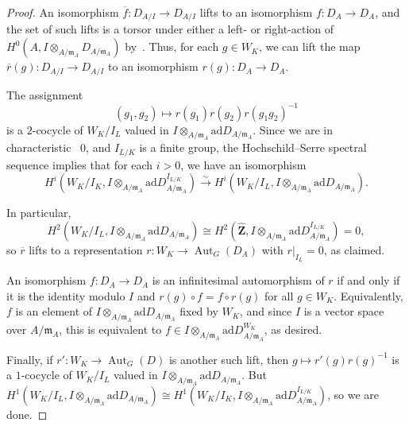\documentclass{amsart}
\renewcommand{\mathbb}{\mathbf}
\def\ad{\mathrm{ad}}
\theoremstyle{definition}
\theoremstyle{remark}
\newcommand{\Z}{\ZZ}
\newcommand{\ZZ}{{\mathbb Z}}
\DeclareMathOperator{\Aut}{Aut}
\begin{document}
\begin{proof}
An isomorphism $\overline{f}:D_{A/I}\rightarrow D_{A/I}$ lifts to an isomorphism $f:D_A\rightarrow D_A$, and the set of such lifts is a torsor under either a left- or right-action of $H^0(A,I\otimes_{A/\mathfrak{m}_A}D_{A/\mathfrak{m}_A})$ by~\cite[Lemma 3.5]{2014arXiv1403.1411B}.  Thus, for each $g\in W_K$, we can lift the map $\overline{r}(g):D_{A/I}\rightarrow D_{A/I}$ to an isomorphism $r(g):D_A\rightarrow D_A$.  

The assignment
\[	(g_1,g_2)\mapsto r(g_1)r(g_2)r(g_1g_2)^{-1}	\]
is a $2$-cocycle of $W_K/I_L$ valued in
$I\otimes_{A/\mathfrak{m}_A}\ad D_{A/\mathfrak{m}_A}$.  Since we are in
characteristic~ $0$, and $I_{L/K}$ is a finite group,  the
Hochschild--Serre spectral sequence implies that for each $i>0$, we
have an isomorphism %
\[ H^i(W_K/I_K,I\otimes_{A/\mathfrak{m}_A}\ad D_{A/\mathfrak{m}_A}^{I_{L/K}})\xrightarrow{\sim} H^i(W_K/I_L,I\otimes_{A/\mathfrak{m}_A}\ad D_{A/\mathfrak{m}_A}).\]%

In particular, 
\[	H^2(W_K/I_L,I\otimes_{A/\mathfrak{m}_A}\ad D_{A/\mathfrak{m}_A})\cong H^2(\widehat{\Z},I\otimes_{A/\mathfrak{m}_A}\ad D_{A/\mathfrak{m}_A}^{I_{L/K}})=0,	\]
so $\overline r$ lifts to a representation $r:W_K\rightarrow
\Aut_G(D_A)$ with $r|_{I_L}=0$, as claimed.

An isomorphism $f:D_A\rightarrow D_A$ is an infinitesimal automorphism of $r$ if and
only if it is the identity modulo $I$ and $r(g)\circ f=f\circ r(g)$ for all $g\in W_K$.  Equivalently, $f$ is an element of $I\otimes_{A/\mathfrak{m}_A}\ad D_{A/\mathfrak{m}_A}$ fixed by $W_K$, and since $I$ is a vector space over $A/\mathfrak{m}_A$, this is equivalent to $f\in I\otimes_{A/\mathfrak{m}_A}\ad D_{A/\mathfrak{m}_A}^{W_K}$, as desired.

Finally, if $r':W_K\rightarrow \Aut_G(D)$ is another such lift, then $g\mapsto r'(g)r(g)^{-1}$ is a $1$-cocycle of $W_K/I_L$ valued in $I\otimes_{A/\mathfrak{m}_A}\ad D_{A/\mathfrak{m}_A}$.  But $H^1(W_K/I_L,I\otimes_{A/\mathfrak{m}_A}\ad D_{A/\mathfrak{m}_A})\cong H^1(W_K/I_{K},I\otimes_{A/\mathfrak{m}_A}\ad D_{A/\mathfrak{m}_A}^{I_{L/K}})$, so we are done.
\end{proof}
\end{document}
